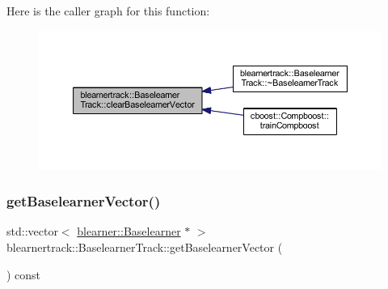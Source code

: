 Here is the caller graph for this function\+:\nopagebreak
\begin{figure}[H]
\begin{center}
\leavevmode
\includegraphics[width=350pt]{classblearnertrack_1_1_baselearner_track_aa178f9d817a01240b6f39075f1f445f2_icgraph}
\end{center}
\end{figure}
\mbox{\label{classblearnertrack_1_1_baselearner_track_a596429982bd5fb1c8ffabc5f93849235}} 
\subsubsection{\texorpdfstring{get\+Baselearner\+Vector()}{getBaselearnerVector()}}
{\footnotesize\ttfamily std\+::vector$<$ \hyperlink{classblearner_1_1_baselearner}{blearner\+::\+Baselearner} $\ast$ $>$ blearnertrack\+::\+Baselearner\+Track\+::get\+Baselearner\+Vector (\begin{DoxyParamCaption}{ }\end{DoxyParamCaption}) const}

